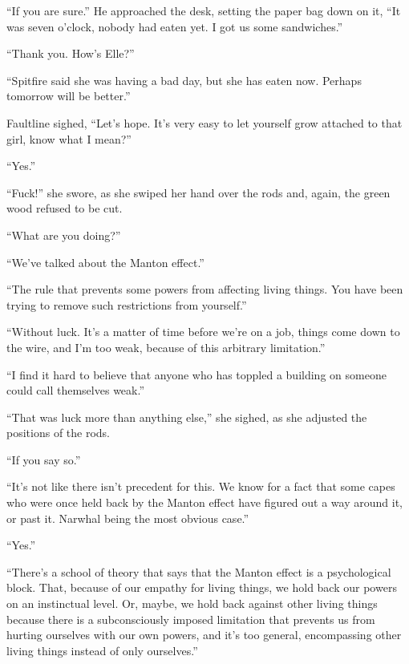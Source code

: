 ``If you are sure.''  He approached the desk, setting the paper bag down on it, ``It was seven o'clock, nobody had eaten yet.  I got us some sandwiches.''



``Thank you.  How's Elle?''



``Spitfire said she was having a bad day, but she has eaten now.  Perhaps tomorrow will be better.''



Faultline sighed, ``Let's hope.  It's very easy to let yourself grow attached to that girl, know what I mean?''



``Yes.''



``Fuck!'' she swore, as she swiped her hand over the rods and, again, the green wood refused to be cut.



``What are you doing?''



``We've talked about the Manton effect.''



``The rule that prevents some powers from affecting living things.  You have been trying to remove such restrictions from yourself.''



``Without luck.  It's a matter of time before we're on a job, things come down to the wire, and I'm too weak, because of this arbitrary limitation.''



``I find it hard to believe that anyone who has toppled a building on someone could call themselves weak.''



``That was luck more than anything else,'' she sighed, as she adjusted the positions of the rods.



``If you say so.''



``It's not like there isn't precedent for this.  We know for a fact that some capes who were once held back by the Manton effect have figured out a way around it, or past it.  Narwhal being the most obvious case.''



``Yes.''



``There's a school of theory that says that the Manton effect is a psychological block.  That, because of our empathy for living things, we hold back our powers on an instinctual level.  Or, maybe, we hold back against other living things because there is a subconsciously imposed limitation that prevents us from hurting ourselves with our own powers, and it's too general, encompassing other living things instead of only ourselves.''



